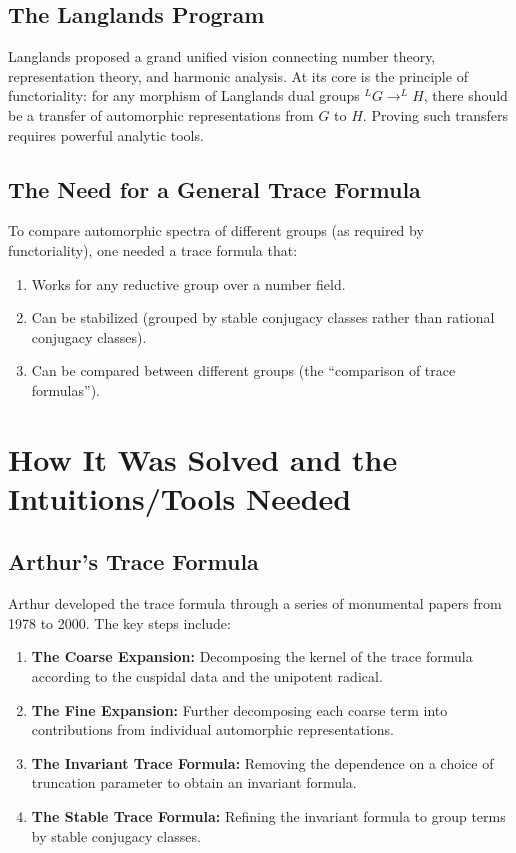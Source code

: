 \subsection{The Langlands Program}

Langlands proposed a grand unified vision connecting number theory, representation theory, and harmonic analysis. At its core is the principle of functoriality: for any morphism of Langlands dual groups $^L G \to ^L H$, there should be a transfer of automorphic representations from $G$ to $H$. Proving such transfers requires powerful analytic tools.

\subsection{The Need for a General Trace Formula}

To compare automorphic spectra of different groups (as required by functoriality), one needed a trace formula that:
\begin{enumerate}
    \item Works for any reductive group over a number field.
    \item Can be stabilized (grouped by stable conjugacy classes rather than rational conjugacy classes).
    \item Can be compared between different groups (the ``comparison of trace formulas'').
\end{enumerate}

\section{How It Was Solved and the Intuitions/Tools Needed}

\subsection{Arthur's Trace Formula}

Arthur developed the trace formula through a series of monumental papers from 1978 to 2000. The key steps include:
\begin{enumerate}
    \item \textbf{The Coarse Expansion:} Decomposing the kernel of the trace formula according to the cuspidal data and the unipotent radical.
    \item \textbf{The Fine Expansion:} Further decomposing each coarse term into contributions from individual automorphic representations.
    \item \textbf{The Invariant Trace Formula:} Removing the dependence on a choice of truncation parameter to obtain an invariant formula.
    \item \textbf{The Stable Trace Formula:} Refining the invariant formula to group terms by stable conjugacy classes.
\end{enumerate}

